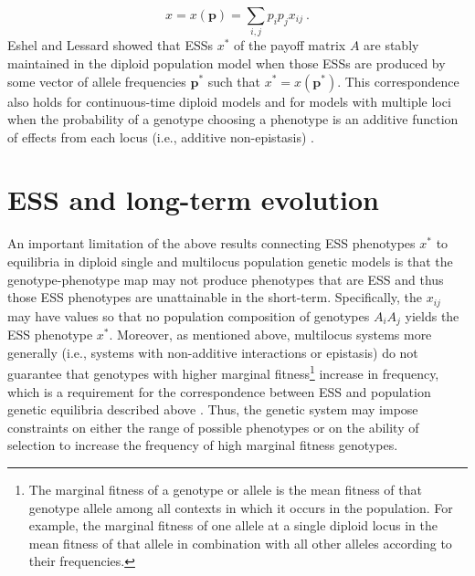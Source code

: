 \documentclass[11pt]{article}
\newcommand{\ess}[1]{#1^*}
\renewcommand{\vec}[1]{\symbf{#1}}
\begin{document}
\begin{equation*}
  x = x(\vec{p}) = \sum_{i,j} p_{i} p_{j} x_{ij} \: .
\end{equation*}
Eshel and Lessard showed \cite{Eshel:1982,Lessard:1984} that ESSs $\ess{x}$ of the payoff matrix $A$ are stably maintained in the diploid population model when those ESSs are produced by some vector of allele frequencies $\ess{\vec{p}}$ such that $\ess{x} = x(\ess{\vec{p}})$. This correspondence also holds for continuous-time diploid models \cite{Sigmund:1987,Cressman:1988,Cressman:Hofbauer:1996,Hofbauer:Sigmund:1998} and for models with multiple loci when the probability of a genotype choosing a phenotype is an additive function of effects from each locus (i.e., additive non-epistasis) \cite{Eshel:1982}.

\section{ESS and long-term evolution}
\label{sec:long-term}

An important limitation of the above results connecting ESS phenotypes $\ess{x}$ to equilibria in diploid single and multilocus population genetic models is that the genotype-phenotype map may not produce phenotypes that are ESS and thus those ESS phenotypes are unattainable in the short-term. Specifically, the $x_{ij}$ may have values so that no population composition of genotypes $A_{i} A_{j}$ yields the ESS phenotype $\ess{x}$. Moreover, as mentioned above, multilocus systems more generally (i.e., systems with non-additive interactions or epistasis) do not guarantee that genotypes with higher marginal fitness\footnote{The marginal fitness of a genotype or allele is the mean fitness of that genotype allele among all contexts in which it occurs in the population. For example, the marginal fitness of one allele at a single diploid locus in the mean fitness of that allele in combination with all other alleles according to their frequencies.} increase in frequency, which is a requirement for the correspondence between ESS and population genetic equilibria described above \cite{Eshel:1982,Hofbauer:Sigmund:1998}. Thus, the genetic system may impose constraints on either the range of possible phenotypes or on the ability of selection to increase the frequency of high marginal fitness genotypes.
\end{document}
